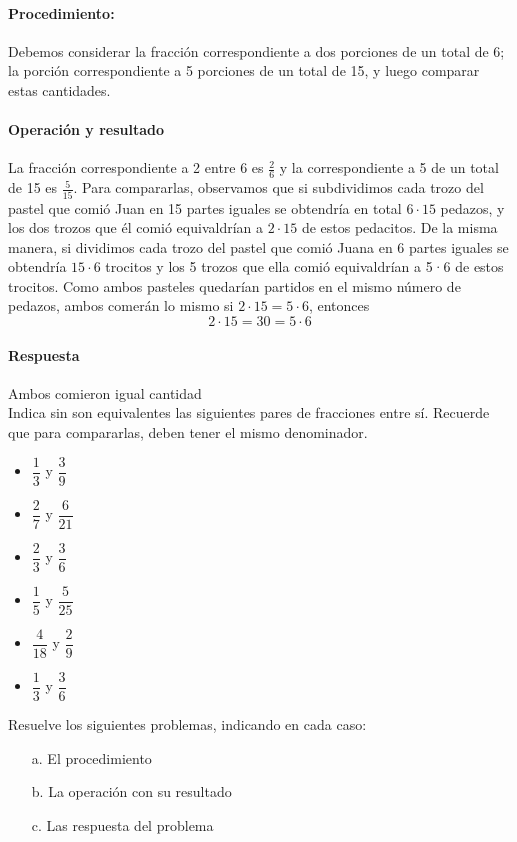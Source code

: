\documentclass[10pt,twoside]{article}
\begin{document}
\paragraph*{Procedimiento:} Debemos considerar la fracción correspondiente a dos porciones de un total de 6; la porción correspondiente a 5 porciones de un total de 15, y luego comparar estas cantidades.
\paragraph*{Operación y resultado}
La fracción correspondiente a 2 entre 6 es $\frac{2}{6}$ y la correspondiente a 5 de un total de 15 es $\frac{5}{15}$. Para compararlas, observamos que si subdividimos cada trozo
del pastel que comió Juan en 15 partes iguales se obtendría en total $6\cdot 15$ pedazos, y los dos trozos que él comió
equivaldrían a $2\cdot 15$ de estos pedacitos. De la misma
manera, si dividimos cada trozo del pastel que comió Juana en 6 partes iguales se obtendría $15\cdot 6$ trocitos y los 5 trozos que ella comió equivaldrían a 5·6 de estos
trocitos. Como ambos pasteles quedarían partidos en el
mismo número de pedazos, ambos comerán lo mismo si $2\cdot 15 = 5\cdot 6$, entonces \[2\cdot 15=30= 5\cdot6\]
\paragraph*{Respuesta}
Ambos comieron igual cantidad\\
Indica sin son equivalentes las siguientes pares de fracciones entre sí. Recuerde que para compararlas, deben tener el mismo denominador.
\begin{itemize}
\item $\dfrac{1}{3}$ y $\dfrac{3}{9}$
\item $\dfrac{2}{7}$ y $\dfrac{6}{21}$
\item $\dfrac{2}{3}$ y $\dfrac{3}{6}$
\item $\dfrac{1}{5}$ y $\dfrac{5}{25}$
\item $\dfrac{4}{18}$ y $\dfrac{2}{9}$
\item $\dfrac{1}{3}$ y $\dfrac{3}{6}$
\end{itemize}
Resuelve los siguientes problemas, indicando en cada caso:
\begin{enumerate}
\item[a.] El procedimiento
\item[b.] La operación con su resultado
\item[c.] Las respuesta del problema
\end{enumerate}
\end{document}
